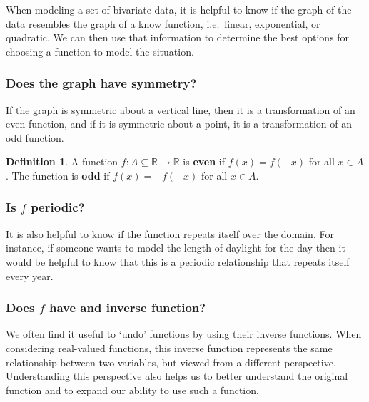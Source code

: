 \documentclass[
]{book}
\theoremstyle{definition}
\newtheorem{definition}{Definition}[chapter]
\theoremstyle{definition}
\theoremstyle{definition}
\theoremstyle{remark}
\begin{document}
When modeling a set of bivariate data, it is helpful to know if the graph of the data resembles the graph of a know function, i.e.~linear, exponential, or quadratic. We can then use that information to determine the best options for choosing a function to model the situation.

\hypertarget{does-the-graph-have-symmetry}{%
\subsubsection*{Does the graph have symmetry?}\label{does-the-graph-have-symmetry}}

If the graph is symmetric about a vertical line, then it is a transformation of an even function, and if it is symmetric about a point, it is a transformation of an odd function.

\begin{definition}
\protect\hypertarget{def:unnamed-chunk-210}{}{\label{def:unnamed-chunk-210} }A function \(f:A\subseteq \mathbb{R}\rightarrow \mathbb{R}\) is \textbf{even} if \(f(x)=f(-x)\) for all \(x\in A\). The function is \textbf{odd} if \(f(x)=-f(-x)\) for all \(x\in A\).
\end{definition}

\hypertarget{is-f-periodic}{%
\subsubsection*{\texorpdfstring{Is \(f\) periodic?}{Is f periodic?}}\label{is-f-periodic}}

It is also helpful to know if the function repeats itself over the domain. For instance, if someone wants to model the length of daylight for the day then it would be helpful to know that this is a periodic relationship that repeats itself every year.

\hypertarget{does-f-have-and-inverse-function}{%
\subsubsection*{\texorpdfstring{Does \(f\) have and inverse function?}{Does f have and inverse function?}}\label{does-f-have-and-inverse-function}}

We often find it useful to `undo' functions by using their inverse functions. When considering real-valued functions, this inverse function represents the same relationship between two variables, but viewed from a different perspective. Understanding this perspective also helps us to better understand the original function and to expand our ability to use such a function.
\end{document}
